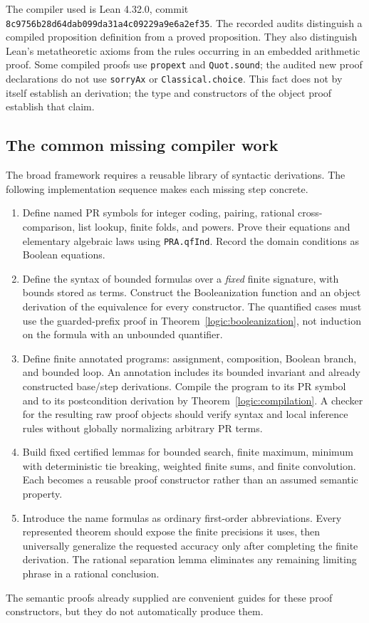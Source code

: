 The compiler used is Lean 4.32.0, commit
\texttt{8c9756b28d64dab099da31a4c09229a9e6a2ef35}.
The recorded audits distinguish a compiled proposition definition from a
proved proposition.  They also distinguish Lean's metatheoretic axioms
from the rules occurring in an embedded arithmetic proof.  Some compiled
proofs use \texttt{propext} and \texttt{Quot.sound}; the audited new proof
declarations do not use \texttt{sorryAx} or \texttt{Classical.choice}.
This fact does not by itself establish an \ipra derivation; the type and
constructors of the object proof establish that claim.

\subsection{The common missing compiler work}

The broad framework requires a reusable library of syntactic derivations.
The following implementation sequence makes each missing step concrete.
\begin{enumerate}
\item Define named PR symbols for integer coding, pairing, rational
cross-comparison, list lookup, finite folds, and powers.  Prove their
equations and elementary algebraic laws using \texttt{PRA.qfInd}.
Record the domain conditions as Boolean equations.
\item Define the syntax of bounded formulas over a \emph{fixed} finite
signature, with bounds stored as terms.  Construct the Booleanization
function and an object derivation of the equivalence for every constructor.
The quantified cases must use the guarded-prefix proof in
Theorem~\ref{logic:booleanization}, not induction on the formula with an
unbounded quantifier.
\item Define finite annotated programs: assignment, composition,
Boolean branch, and bounded loop.  An annotation includes its bounded
invariant and already constructed base/step derivations.  Compile the
program to its PR symbol and to its postcondition derivation by
Theorem~\ref{logic:compilation}.  A checker for the resulting raw proof
objects should verify syntax and local inference rules without globally
normalizing arbitrary PR terms.
\item Build fixed certified lemmas for bounded search, finite maximum,
minimum with deterministic tie breaking, weighted finite sums, and
finite convolution.  Each becomes a reusable proof constructor rather
than an assumed semantic property.
\item Introduce the name formulas as ordinary first-order abbreviations.
Every represented theorem should expose the finite precisions it uses,
then universally generalize the requested accuracy only after completing
the finite derivation.  The rational separation lemma eliminates any
remaining limiting phrase in a rational conclusion.
\end{enumerate}
The semantic proofs already supplied are convenient guides for these
proof constructors, but they do not automatically produce them.


